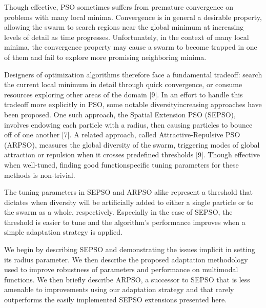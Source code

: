 \documentclass[pdftex,11pt]{article}
\begin{document}
Though effective, PSO sometimes suffers from premature convergence on problems with many local minima. Convergence is in general a desirable property, allowing the swarm to search regions near the global minimum at increasing levels of detail as time progresses. Unfortunately, in the context of many local minima, the convergence property may cause a swarm to become trapped in one of them and fail to explore more promising neighboring minima.

Designers of optimization algorithms therefore face a fundamental tradeoff: search the current local minimum in detail through quick convergence, or consume resources exploring other areas of the domain [9]. In an effort to handle this tradeoff more explicitly in PSO, some notable diversityincreasing approaches have been proposed. One such approach, the Spatial Extension PSO (SEPSO), involves endowing each particle with a radius, then causing particles to bounce off of one another [7]. A related approach, called Attractive-Repulsive PSO (ARPSO), measures the global diversity of the swarm, triggering modes of global attraction or repulsion when it crosses predefined thresholds [9]. Though effective when well-tuned, finding good functionspecific tuning parameters for these methods is non-trivial.

The tuning parameters in SEPSO and ARPSO alike represent a threshold that dictates when diversity will be artificially added to either a single particle or to the swarm as a whole, respectively. Especially in the case of SEPSO, the threshold is easier to tune and the algorithm’s performance
improves when a simple adaptation strategy is applied.

We begin by describing SEPSO and demonstrating the issues implicit in setting its radius parameter. We then describe the proposed adaptation methodology used to improve robustness of parameters and performance on multimodal functions. We then briefly describe ARPSO, a successor to SEPSO that is less amenable to improvements using our adaptation strategy and that rarely outperforms the easily implemented SEPSO extensions presented here.
\end{document}
